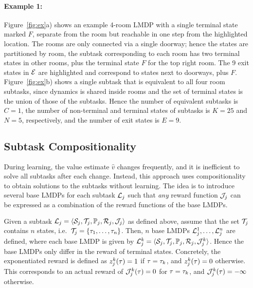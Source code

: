 \paragraph{Example 1:} Figure~\ref{fig:ex}a) shows an example 4-room LMDP with a single terminal state marked $F$, separate from the room but reachable in one step from the highlighted location. The rooms are only connected via a single doorway; hence the states are partitioned by room, the subtask corresponding to each room has two terminal states in other rooms, plus the terminal state $F$ for the top right room. The 9 exit states in $\mathcal{E}$ are highlighted and correspond to states next to doorways, plus $F$. Figure~\ref{fig:ex}b) shows a single subtask that is equivalent to all four room subtasks, since dynamics is shared inside rooms and the set of terminal states is the union of those of the subtasks.
Hence the number of equivalent subtasks is $C=1$, the number of non-terminal and terminal states of subtasks is $K=25$ and $N=5$, respectively, and the number of exit states is $E=9$.

\subsection{Subtask Compositionality}

During learning, the value estimate $\widehat{v}$ changes frequently, and it is inefficient to solve all subtasks after each change. Instead, this approach uses compositionality to obtain solutions to the subtasks without learning. The idea is to introduce several base LMDPs for each subtask $\mathcal{L}_j$ such that {\em any} reward function $\mathcal{J}_j$ can be expressed as a combination of the reward functions of the base LMDPs.

Given a subtask $\mathcal{L}_j=\langle\mathcal{S}_j,\mathcal{T}_j,\mathbb{P}_j,\mathcal{R}_j,\mathcal{J}_j\rangle$ as defined above, assume that the set $\mathcal{T}_j$ contains $n$ states, i.e.~$\mathcal{T}_j=\{\tau_1,\ldots,\tau_n\}$. Then, $n$ base LMDPs $\mathcal{L}_j^1,\ldots,\mathcal{L}_j^n$ are defined, where each base LMDP is given by $\mathcal{L}_j^k=\langle\mathcal{S}_j,\mathcal{T}_j,\mathbb{P}_j,\mathcal{R}_j,\mathcal{J}_j^k\rangle$. Hence the base LMDPs only differ in the reward of terminal states.
Concretely, the exponentiated reward is defined as $z_j^k(\tau)=1$ if $\tau=\tau_k$, and $z_j^k(\tau)=0$ otherwise.
This corresponds to an actual reward of $\mathcal{J}_j^k(\tau)=0$ for $\tau=\tau_k$, and $\mathcal{J}_j^k(\tau)=-\infty$ otherwise.

